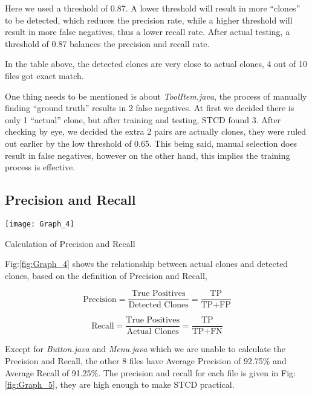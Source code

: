 \documentclass[../main.tex]{subfiles}
\begin{document}
Here we used a threshold of 0.87. A lower threshold will result in more ``clones'' to be detected, which reduces the precision rate, while a higher threshold will result in more false negatives, thus a lower recall rate. After actual testing, a threshold of 0.87 balances the precision and recall rate.

In the table above, the detected clones are very close to actual clones, 4 out of 10 files got exact match.

One thing needs to be mentioned is about \textit{ToolItem.java}, the process of manually finding ``ground truth'' results in 2 false negatives. At first we decided there is only 1 ``actual'' clone, but after training and testing, STCD found 3. After checking by eye, we decided the extra 2 pairs are actually clones, they were ruled out earlier by the low threshold of 0.65. This being said, manual selection does result in false negatives, however on the other hand, this implies the training process is effective.

\subsection{Precision and Recall}

\begin{figurehere}
\centering \texttt{[image: Graph\_4]} 
\caption{Calculation of Precision and Recall} \label{fig:Graph_4}
\end{figurehere}

Fig:\ref{fig:Graph_4} shows the relationship between actual clones and detected clones, based on the definition of Precision and Recall, 

\begin{equation}
\text{Precision} = \frac{ \text{True Positives}} {\text{Detected Clones}} = \frac{ \text{TP}} {\text{TP} + \text{FP}}
\end{equation}

\begin{equation}
\text{Recall} = \frac{ \text{True Positives}} {\text{Actual Clones}} = \frac{ \text{TP}} {\text{TP} + \text{FN}}
\end{equation}

Except for \textit{Button.java} and \textit{Menu.java} which we are unable to calculate the Precision and Recall, the other 8 files have Average Precision of 92.75\% and Average Recall of 91.25\%. The precision and recall for each file is given in Fig:\ref{fig:Graph_5}, they are high enough to make STCD practical.
\end{document}
